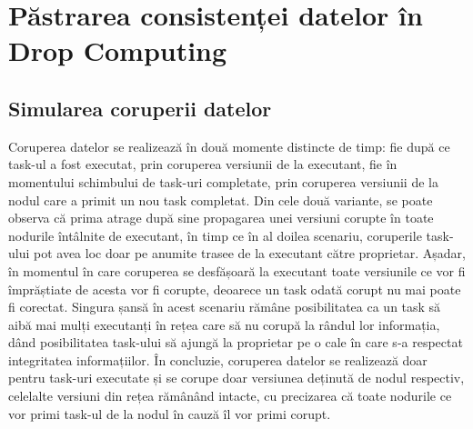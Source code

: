 \documentclass[12pt,a4paper]{report}
\begin{document}

\section{Păstrarea consistenței datelor în Drop Computing} \label{solutieConsistenta}

\subsection{Simularea coruperii datelor}	\label{simulareaCoruperii}

Coruperea datelor se realizează în două momente distincte de timp: fie după ce task-ul a fost executat, prin coruperea versiunii de la executant, fie în momentului schimbului de task-uri completate, prin coruperea versiunii de la nodul care a primit un nou task completat. Din cele două variante, se poate observa că prima atrage după sine propagarea unei versiuni corupte în toate nodurile întâlnite de executant, în timp ce în al doilea scenariu, coruperile task-ului pot avea loc doar pe anumite trasee de la executant către proprietar. Așadar, în momentul în care coruperea se desfășoară la executant toate versiunile ce vor fi împrăștiate de acesta vor fi corupte, deoarece un task odată corupt nu mai poate fi corectat. Singura șansă în acest scenariu rămâne posibilitatea ca un task să aibă mai mulți executanți în rețea care să nu corupă la rândul lor informația, dând posibilitatea task-ului să ajungă la proprietar pe o cale în care s-a respectat integritatea informațiilor. 
În concluzie, coruperea datelor se realizează doar pentru task-uri executate și se corupe doar versiunea deținută de nodul respectiv, celelalte versiuni din rețea rămânând intacte, cu precizarea că toate nodurile ce vor primi task-ul de la nodul în cauză îl vor primi corupt.
\end{document}
